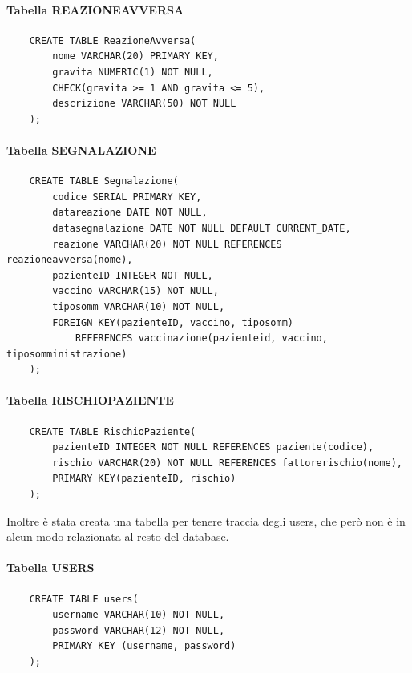 \documentclass{article}
\begin{document}
\paragraph*{Tabella REAZIONEAVVERSA}
\begin{verbatim}
    CREATE TABLE ReazioneAvversa(
        nome VARCHAR(20) PRIMARY KEY,
        gravita NUMERIC(1) NOT NULL,
        CHECK(gravita >= 1 AND gravita <= 5),
        descrizione VARCHAR(50) NOT NULL
    );
\end{verbatim}
\paragraph*{Tabella SEGNALAZIONE}
\begin{verbatim}
    CREATE TABLE Segnalazione(
        codice SERIAL PRIMARY KEY,
        datareazione DATE NOT NULL,
        datasegnalazione DATE NOT NULL DEFAULT CURRENT_DATE,
        reazione VARCHAR(20) NOT NULL REFERENCES reazioneavversa(nome),
        pazienteID INTEGER NOT NULL,
        vaccino VARCHAR(15) NOT NULL,
        tiposomm VARCHAR(10) NOT NULL,
        FOREIGN KEY(pazienteID, vaccino, tiposomm) 
            REFERENCES vaccinazione(pazienteid, vaccino, tiposomministrazione)
    );
\end{verbatim}
\paragraph*{Tabella RISCHIOPAZIENTE}
\begin{verbatim}
    CREATE TABLE RischioPaziente(
        pazienteID INTEGER NOT NULL REFERENCES paziente(codice),
        rischio VARCHAR(20) NOT NULL REFERENCES fattorerischio(nome),
        PRIMARY KEY(pazienteID, rischio)
    );
\end{verbatim}
Inoltre è stata creata una tabella per tenere traccia degli users, che però non è in alcun modo relazionata al resto del database.
\paragraph*{Tabella USERS}
\begin{verbatim}
    CREATE TABLE users(
        username VARCHAR(10) NOT NULL,
        password VARCHAR(12) NOT NULL,
        PRIMARY KEY (username, password)
    );
\end{verbatim}
\end{document}
